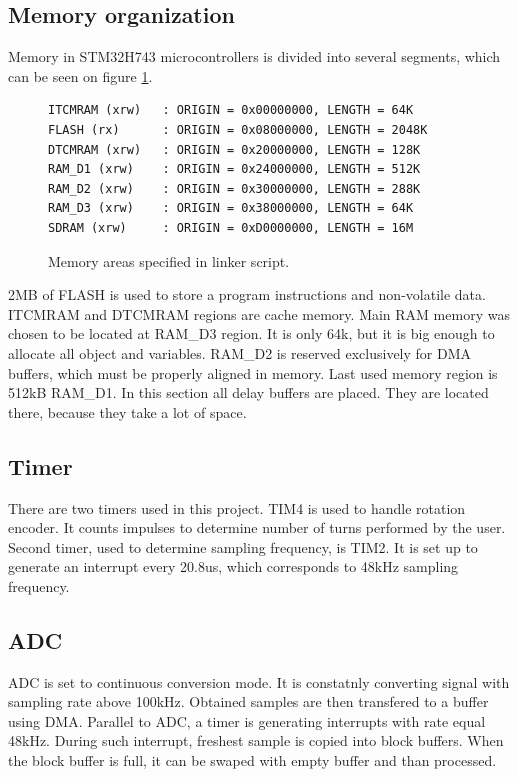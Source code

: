 \documentclass[a4paper,twoside,12pt]{book}
\begin{document}
\subsection{Memory organization}
Memory in STM32H743 microcontrollers is divided into several segments,
which can be seen on figure \ref{fig:mem}.

\begin{figure}[H]
\centering
\begin{lstlisting}
ITCMRAM (xrw)   : ORIGIN = 0x00000000, LENGTH = 64K
FLASH (rx)      : ORIGIN = 0x08000000, LENGTH = 2048K
DTCMRAM (xrw)   : ORIGIN = 0x20000000, LENGTH = 128K
RAM_D1 (xrw)    : ORIGIN = 0x24000000, LENGTH = 512K
RAM_D2 (xrw)    : ORIGIN = 0x30000000, LENGTH = 288K
RAM_D3 (xrw)    : ORIGIN = 0x38000000, LENGTH = 64K
SDRAM (xrw)     : ORIGIN = 0xD0000000, LENGTH = 16M
\end{lstlisting}
\caption{Memory areas specified in linker script.}
\label{fig:mem}
\end{figure}

2MB of FLASH is used to store a program instructions and non-volatile data.
ITCMRAM and DTCMRAM regions are cache memory.
Main RAM memory was chosen to be located at RAM\_D3 region.
It is only 64k, but it is big enough to allocate all object and variables.
RAM\_D2 is reserved exclusively for DMA buffers,
which must be properly aligned in memory.
Last used memory region is 512kB RAM\_D1.
In this section all delay buffers are placed.
They are located there, because they take a lot of space.

\subsection{Timer}
There are two timers used in this project.
TIM4 is used to handle rotation encoder.
It counts impulses to determine number of turns 
performed by the user.
Second timer, used to determine sampling frequency, is TIM2.
It is set up to generate an interrupt every 20.8us,
which corresponds to 48kHz sampling frequency.

\subsection{ADC}
ADC is set to continuous conversion mode.
It is constatnly converting signal with sampling rate above 100kHz.
Obtained samples are then transfered to a buffer using DMA.
Parallel to ADC, a timer is generating interrupts
with rate equal 48kHz. During such interrupt,
freshest sample is copied into block buffers. 
When the block buffer is full, it can be swaped with empty buffer
and than processed.
\end{document}

